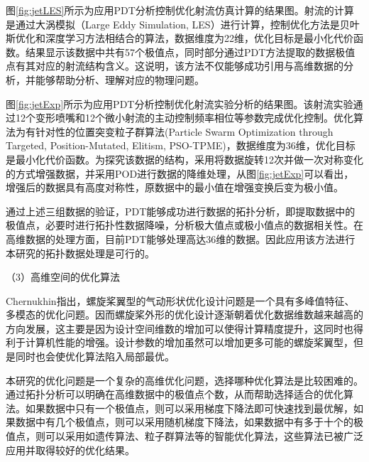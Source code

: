 图\ref{fig:jetLES}所示为应用PDT分析控制优化射流仿真计算的结果图。射流的计算是通过大涡模拟（Large Eddy Simulation, LES）进行计算，控制优化方法是贝叶斯优化和深度学习方法相结合的算法，数据维度为22维，优化目标是最小化代价函数。结果显示该数据中共有57个极值点，同时部分通过PDT方法提取的数据极值点有其对应的射流结构含义。这说明，该方法不仅能够成功引用与高维数据的分析，并能够帮助分析、理解对应的物理问题。



图\ref{fig:jetExp}所示为应用PDT分析控制优化射流实验分析的结果图。该射流实验通过12个变形喷嘴和12个微小射流的主动控制频率相位等参数完成优化控制。优化算法为有针对性的位置突变粒子群算法(Particle Swarm Optimization through Targeted, Position-Mutated, Elitism, PSO-TPME)\cite{Shaqarin2023}，数据维度为36维，优化目标是最小化代价函数。为探究该数据的结构，采用将数据旋转12次并做一次对称变化的方式增强数据，并采用POD进行数据的降维处理，从图\ref{fig:jetExp}可以看出，增强后的数据具有高度对称性，原数据中的最小值在增强变换后变为极小值。




通过上述三组数据的验证，PDT能够成功进行数据的拓扑分析，即提取数据中的极值点，必要时进行拓扑性数据降噪，分析极大值点或极小值点的数据相关性。在高维数据的处理方面，目前PDT能够处理高达36维的数据。因此应用该方法进行本研究的拓扑数据处理是可行的。


（3）高维空间的优化算法

Chernukhin\cite{Oleg2013}指出，螺旋桨翼型的气动形状优化设计问题是一个具有多峰值特征、多模态的优化问题。因而螺旋桨外形的优化设计逐渐朝着优化数据维数越来越高的方向发展，这主要是因为设计空间维数的增加可以使得计算精度提升，这同时也得利于计算机性能的增强。设计参数的增加虽然可以增加更多可能的螺旋桨翼型，但是同时也会使优化算法陷入局部最优\cite{Nikhil2013}。

本研究的优化问题是一个复杂的高维优化问题，选择哪种优化算法是比较困难的。通过拓扑分析可以明确在高维数据中的极值点个数，从而帮助选择适合的优化算法。如果数据中只有一个极值点，则可以采用梯度下降法即可快速找到最优解，如果数据中有几个极值点，则可以采用随机梯度下降法，如果数据中有多于十个的极值点，则可以采用如遗传算法、粒子群算法等的智能优化算法，这些算法已被广泛应用并取得较好的优化结果。




\vspace{0.8em}
